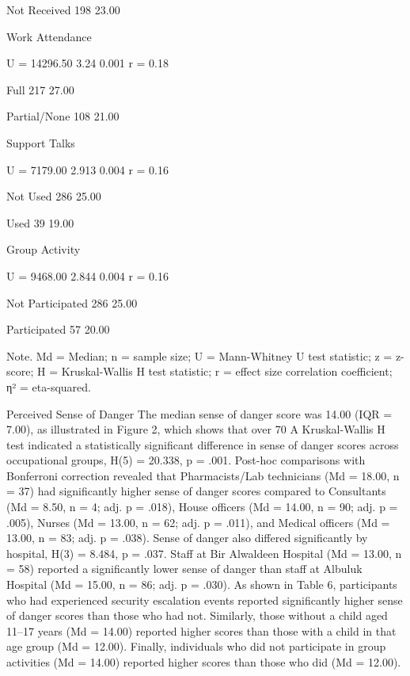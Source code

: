    Not Received
198
23.00





Work Attendance


U = 14296.50
3.24
0.001
r = 0.18

   Full
217
27.00





   Partial/None
108
21.00





Support Talks


U = 7179.00
2.913
0.004
r = 0.16

   Not Used
286
25.00





   Used
39
19.00





Group Activity


U = 9468.00
2.844
0.004
r = 0.16

   Not Participated
286
25.00





   Participated
57
20.00





Note. Md = Median; n = sample size; U = Mann-Whitney U test statistic; z = z-score; H = Kruskal-Wallis H test statistic; r = effect size correlation coefficient; η² = eta-squared.

Perceived Sense of Danger
The median sense of danger score was 14.00 (IQR = 7.00), as illustrated in Figure 2, which shows that over 70%
A Kruskal-Wallis H test indicated a statistically significant difference in sense of danger scores across occupational groups, H(5) = 20.338, p = .001. Post-hoc comparisons with Bonferroni correction revealed that Pharmacists/Lab technicians (Md = 18.00, n = 37) had significantly higher sense of danger scores compared to Consultants (Md = 8.50, n = 4; adj. p = .018), House officers (Md = 14.00, n = 90; adj. p = .005), Nurses (Md = 13.00, n = 62; adj. p = .011), and Medical officers (Md = 13.00, n = 83; adj. p = .038).
Sense of danger also differed significantly by hospital, H(3) = 8.484, p = .037. Staff at Bir Alwaldeen Hospital (Md = 13.00, n = 58) reported a significantly lower sense of danger than staff at Albuluk Hospital (Md = 15.00, n = 86; adj. p = .030).
As shown in Table 6, participants who had experienced security escalation events reported significantly higher sense of danger scores than those who had not. Similarly, those without a child aged 11–17 years (Md = 14.00) reported higher scores than those with a child in that age group (Md = 12.00). Finally, individuals who did not participate in group activities (Md = 14.00) reported higher scores than those who did (Md = 12.00).






